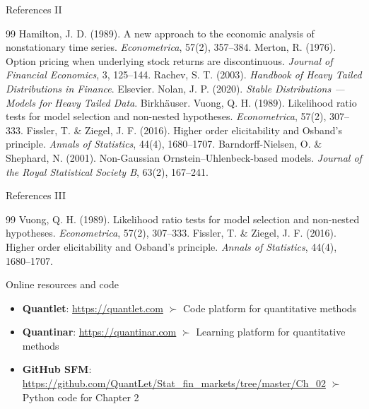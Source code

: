 \documentclass[9pt, aspectratio=169, t]{beamer}
\theoremstyle{definition}
\begin{document}
\begin{frame}{References II}
\small
\begin{thebibliography}{99}
 Hamilton, J. D. (1989). A new approach to the economic analysis of nonstationary time series. \textit{Econometrica}, 57(2), 357--384.
 Merton, R. (1976). Option pricing when underlying stock returns are discontinuous. \textit{Journal of Financial Economics}, 3, 125--144.
 Rachev, S. T. (2003). \textit{Handbook of Heavy Tailed Distributions in Finance}. Elsevier.
 Nolan, J. P. (2020). \textit{Stable Distributions --- Models for Heavy Tailed Data}. Birkh\"{a}user.
 Vuong, Q. H. (1989). Likelihood ratio tests for model selection and non-nested hypotheses. \textit{Econometrica}, 57(2), 307--333.
 Fissler, T. \& Ziegel, J. F. (2016). Higher order elicitability and Osband's principle. \textit{Annals of Statistics}, 44(4), 1680--1707.
 Barndorff-Nielsen, O. \& Shephard, N. (2001). Non-Gaussian Ornstein--Uhlenbeck-based models. \textit{Journal of the Royal Statistical Society B}, 63(2), 167--241.
\end{thebibliography}
\end{frame}

\begin{frame}{References III}
\small
\begin{thebibliography}{99}
 Vuong, Q. H. (1989). Likelihood ratio tests for model selection and non-nested hypotheses. \textit{Econometrica}, 57(2), 307--333.
 Fissler, T. \& Ziegel, J. F. (2016). Higher order elicitability and Osband's principle. \textit{Annals of Statistics}, 44(4), 1680--1707.
\end{thebibliography}

\vspace{0.3cm}
\begin{block}{Online resources and code}
{\small
\begin{itemize}\setlength{\itemsep}{0pt}
    \item \textbf{Quantlet}: \url{https://quantlet.com} $\succ$ Code platform for quantitative methods
    \item \textbf{Quantinar}: \url{https://quantinar.com} $\succ$ Learning platform for quantitative methods
    \item \textbf{GitHub SFM}: \url{https://github.com/QuantLet/Stat_fin_markets/tree/master/Ch_02} $\succ$ Python code for Chapter 2
\end{itemize}
}
\end{block}
\end{frame}
\end{document}
